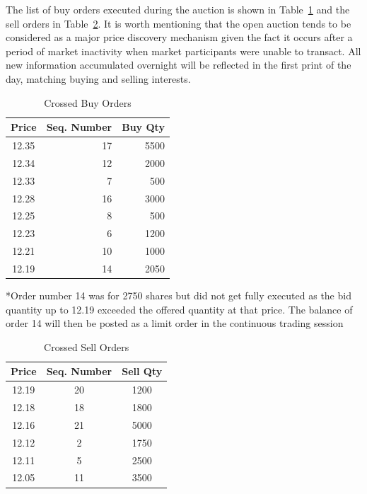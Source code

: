 The list of buy orders executed during the auction is shown in Table~\ref{tab:openAuct4} and the sell orders in Table~\ref{tab:openAuct5}. It is worth mentioning that the open auction tends to be considered as a major price discovery mechanism given the fact it occurs after a period of market inactivity when market participants were unable to transact. All new information accumulated overnight will be reflected in the first print of the day, matching buying and selling interests.  


\begin{table}[!ht]
   \centering
   \caption{Crossed Buy Orders \label{tab:openAuct4}}
   \begin{tabular}{crr} 
	Price & Seq. Number & Buy Qty  \\ \hline
	12.35 &  17 & 5500 \\
	12.34 & 12 & 2000\\	
	12.33 & 7  & 500\\			
	12.28 &  16 & 3000\\	
	12.25 & 8 & 500\\	
	12.23 & 6 & 1200\\		
	12.21  & 10& 1000\\		
	12.19 &  14  & 2050 		
   \end{tabular}
\begin{minipage}[t]{1\textwidth}
\small{*Order number 14 was for 2750 shares but did not get fully executed as the bid quantity up to 12.19 exceeded the offered quantity at that price. The balance of order 14 will then be posted as a limit order in the continuous trading session}
\end{minipage}   
\end{table}

	
\begin{table}[!ht]
   \centering
   \caption{Crossed Sell Orders\label{tab:openAuct5}}
   \hspace*{-3.3cm}
   \begin{tabular}{ccc} 
	Price & Seq. Number & Sell Qty  \\ \hline
	12.19 &  20 & 1200 \\
	12.18 &  18 & 1800 \\
	12.16 &  21 & 5000 \\
	12.12 & 2 & 1750 \\		
	12.11 & 5 & 2500 \\				
	12.05 & 11 & 3500 		
   \end{tabular}
\end{table}	


